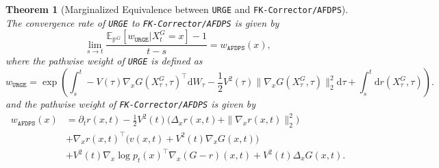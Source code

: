 \documentclass{article}
\theoremstyle{plain}
\newtheorem{theorem}{Theorem}[section]
\theoremstyle{definition}
\theoremstyle{remark}
\newcommand{\dif}{{\mathrm{d}}}
\renewcommand{\P}{{\mathbb{P}}}
\begin{document}
\begin{theorem}[Marginalized Equivalence between \texttt{URGE} and \texttt{FK-Corrector/AFDPS}]
    The convergence rate of \texttt{URGE} to \texttt{FK-Corrector/AFDPS} is given by
    \[
    \lim_{s\rightarrow t}\frac{\mathbb{E}_{\P^G}\left[w_{\texttt{URGE}} \big| X_t^G=x\right]-1}{t-s} = w_{\texttt{AFDPS}}(x),
    \]
    where the pathwise weight of \texttt{URGE} is defined as
    \[
    w_{\texttt{URGE}} = \exp\left(\int_s^t -V(\tau)\nabla_x G(X_\tau^G,\tau)^\top \dif W_\tau - \frac{1}{2} V^2(\tau)\|\nabla_x G(X_\tau^G,\tau)\|_2^2\dif \tau + \int_s^t \dif r(X_\tau^G,\tau)\right).
    \]
    and the pathwise weight of \texttt{FK-Corrector/AFDPS} is given by
    \[
    \begin{aligned}
        w_{\texttt{AFDPS}}(x) &= \partial_t r(x,t) -\tfrac12 V^2(t)\big(\Delta_x r(x,t)+\|\nabla_x r(x,t)\|^2_2\big) \\
        &+ \nabla_x r(x,t)^{\top}\big(v(x,t)+V^2(t)\nabla_x G(x,t)\big) \\
        &+ V^2(t)\nabla_x\log p_t(x)^{\top}\nabla_x(G-r)(x,t)+ V^2(t)\Delta_x G(x,t).
    \end{aligned}
    \]
\end{theorem}
\end{document}
